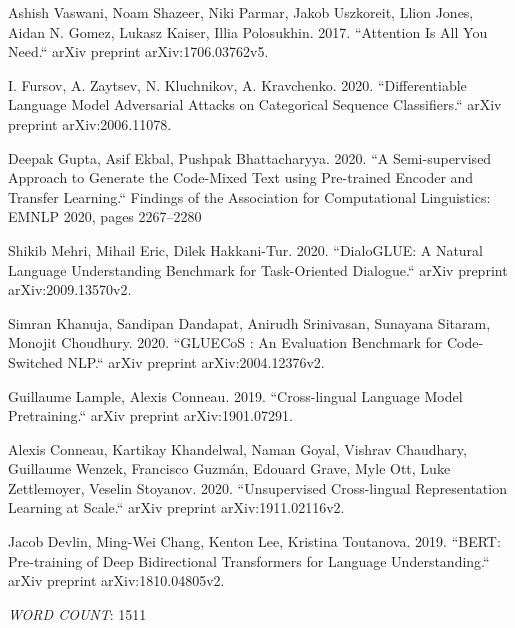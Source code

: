 \documentclass[conference]{IEEEtran}
\begin{document}
\begin{thebibliography}{00}

 Ashish Vaswani, Noam Shazeer, Niki Parmar, Jakob Uszkoreit, Llion Jones, Aidan N. Gomez, Lukasz Kaiser, Illia Polosukhin. 2017. ``Attention Is All You Need.`` arXiv preprint arXiv:1706.03762v5.

 I. Fursov, A. Zaytsev, N. Kluchnikov, A. Kravchenko. 2020. ``Differentiable Language Model Adversarial Attacks on Categorical Sequence Classifiers.`` arXiv preprint arXiv:2006.11078.

 Deepak Gupta, Asif Ekbal, Pushpak Bhattacharyya. 2020. ``A Semi-supervised Approach to Generate the Code-Mixed Text using Pre-trained Encoder and Transfer Learning.`` Findings of the Association for Computational Linguistics: EMNLP 2020, pages 2267–2280

 Shikib Mehri, Mihail Eric, Dilek Hakkani-Tur. 2020. ``DialoGLUE: A Natural Language Understanding Benchmark for Task-Oriented Dialogue.`` arXiv preprint arXiv:2009.13570v2.

 Simran Khanuja, Sandipan Dandapat, Anirudh Srinivasan, Sunayana Sitaram, Monojit Choudhury. 2020. ``GLUECoS : An Evaluation Benchmark for Code-Switched NLP.`` arXiv preprint arXiv:2004.12376v2.

 Guillaume Lample, Alexis Conneau. 2019. ``Cross-lingual Language Model Pretraining.`` arXiv preprint arXiv:1901.07291.

 Alexis Conneau, Kartikay Khandelwal, Naman Goyal, Vishrav Chaudhary, Guillaume Wenzek, Francisco Guzmán, Edouard Grave, Myle Ott, Luke Zettlemoyer, Veselin Stoyanov. 2020. ``Unsupervised Cross-lingual Representation Learning at Scale.`` arXiv preprint arXiv:1911.02116v2.

 Jacob Devlin, Ming-Wei Chang, Kenton Lee, Kristina Toutanova. 2019. ``BERT: Pre-training of Deep Bidirectional Transformers for Language Understanding.`` arXiv preprint arXiv:1810.04805v2.

\end{thebibliography}
\vspace{12pt}
\textit{WORD COUNT}: 1511
\end{document}
